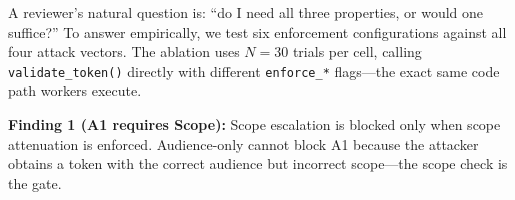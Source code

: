 \documentclass[journal]{IEEEtran}
\begin{document}
A reviewer's natural question is: ``do I need all three properties, or would one suffice?'' To answer empirically, we test six enforcement configurations against all four attack vectors. The ablation uses $N = 30$ trials per cell, calling \texttt{validate\_token()} directly with different \texttt{enforce\_*} flags—the exact same code path workers execute.

\begin{table}[h]
\caption{Ablation study: property independence ($N=30$ per cell; 720 total trials)}
\label{tab:ablation}
\centering
\footnotesize
\setlength{\tabcolsep}{4pt}
\end{table}

\textbf{Finding 1 (A1 requires Scope):} Scope escalation is blocked only when scope attenuation is enforced. Audience-only cannot block A1 because the attacker obtains a token with the correct audience but incorrect scope—the scope check is the gate.
\end{document}

